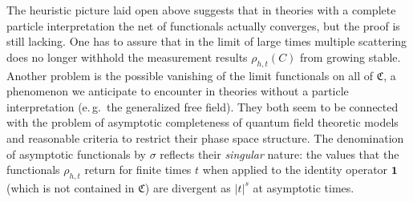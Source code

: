 \documentclass[a4paper,a4paper]{article}
\numberwithin{equation}{section}
\newcommand{\Cfrak}{\mathfrak{C}}
\newcommand{\unit}{\mathbf{1}}
\theoremstyle{definition}
\theoremstyle{plain}
\theoremstyle{remark}
\newcommand{\abs}[1]{\lvert #1 \rvert}
\begin{document}
  The heuristic picture laid open above suggests that in theories with
  a complete particle interpretation the net of functionals actually
  converges, but the proof is still lacking. One has to assure that in
  the limit of large times multiple scattering does no longer withhold
  the measurement results $\rho_{h , t} ( C )$ from growing stable.
  Another problem is the possible vanishing of the limit functionals
  on all of $\Cfrak$, a phenomenon we anticipate to encounter in
  theories without a particle interpretation (e.\,g.~the generalized
  free field). They both seem to be connected with the problem of
  asymptotic completeness of quantum field theoretic models and
  reasonable criteria to restrict their phase space structure. The
  denomination of asymptotic functionals by $\sigma$ reflects their
  \emph{singular} nature: the values that the functionals $\rho_{h ,
  t}$ return for finite times $t$ when applied to the identity
  operator $\unit$ (which is not contained in $\Cfrak$) are divergent
  as $\abs{t}^s$ at asymptotic times.
  
\end{document}

